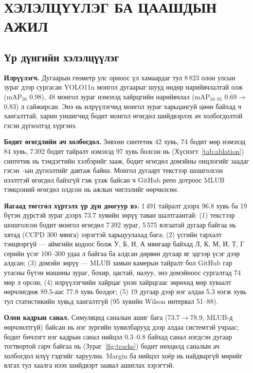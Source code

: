 \chapter{ХЭЛЭЛЦҮҮЛЭГ БА ЦААШДЫН АЖИЛ}
\section{Үр дүнгийн хэлэлцүүлэг}
\textbf{Илрүүлэгч.} Дугаарын геометр улс орноос үл хамаардаг тул 8\,823 олон улсын зураг дээр сургасан YOLO11n монгол дугаарыг шууд өндөр нарийвчлалтай олж (mAP$_{50}$ 0.98), 48 монгол зураг нэмэхэд хайрцгийн нарийвчлал (mAP$_{50\text{--}95}$ 0.69$\to$0.83) л сайжирсан. Энэ нь илрүүлэгчид монгол зураг харьцангуй цөөн байхад ч хангалттай, харин уншигчид бодит монгол өгөгдөл шийдвэрлэх ач холбогдолтой гэсэн дүгнэлтэд хүргэнэ.

\textbf{Бодит өгөгдлийн ач холбогдол.} Зөвхөн синтетик 42 хувь, 74 бодит мөр нэмэхэд 84 хувь, 7\,392 бодит тайралт нэмэхэд 97 хувь болсон нь (Хүснэгт~\ref{tab:ablation}) синтетик нь тэмдэгтийн хэлбэрийг зааж, бодит өгөгдөл домэйны онцлогийг заадаг гэсэн~\cite{jaderberg2014,ruder2022}-ын дүгнэлтийг давтаж байна. Монгол дугаарт текстээр шошголсон нээлттэй өгөгдөл байхгүй гэж үзэж байсан ч GitHub репо дотроос MLUB тэмцээний өгөгдөл олдсон нь ажлын чиглэлийг өөрчилсөн.

\textbf{Яагаад төгсгөл хүртэлх үр дүн доогуур вэ.} 1\,491 тайралт дээрх 96.8 хувь ба 19 бүтэн дүрстэй зураг дээрх 73.7 хувийн зөрүү таван шалтгаантай: (1) текстээр шошголсон бодит монгол өгөгдөл 7\,392 зураг, 5\,575 ялгаатай дугаар байгаа нь хятад (CCPD 300 мянга) зэрэгтэй харьцуулахад бага; (2) үсгийн тархалт тэнцвэргүй --- аймгийн кодоос болж У, Б, Н, А мянгаар байхад Л, К, М, И, Т, Г серийн үсэг 100--300 удаа л байгаа ба алдсан дөрвөн дугаар яг эдгээр үсэг дээр алдсан; (3) домэйн зөрүү --- MLUB замын камерын тайралт бол GitHub гар утасны бүтэн машины зураг, бохир, цастай, налуу, энэ домэйноос сургалтад 74 мөр л орсон; (4) илрүүлэгчийн хайрцаг үнэн хайрцгаас зөрөхөд мөр хуваалт өөрчлөгдөж 89.5-аас 77.8 хувь болдог; (5) 19 дугаар дээр нэг алдаа 5.3 нэгж хувь тул статистикийн хувьд хангалтгүй (95 хувийн Wilson интервал 51--88).

\textbf{Олон кадрын санал.} Симуляцид саналын ашиг бага (73.7$\to$78.9, MLUB-д өөрчлөлтгүй) байсан нь нэг зургийн хувилбарууд дээр алдаа системтэй учраас; бодит бичлэгт нэг кадрын санал нийцэл 0.3--0.8 байхад санал нэгдсэн дугаар тогтвортой гарч байгаа нь (Зураг~\ref{fig:tracks}) бодит нөхцөлд саналын ач холбогдол илүү гэдгийг харуулна. Margin ба нийцэл хоёр нь найдваргүй мөрийг ялгах тул хаалга нээх шийдвэрт заавал ашиглах хэрэгтэй.

